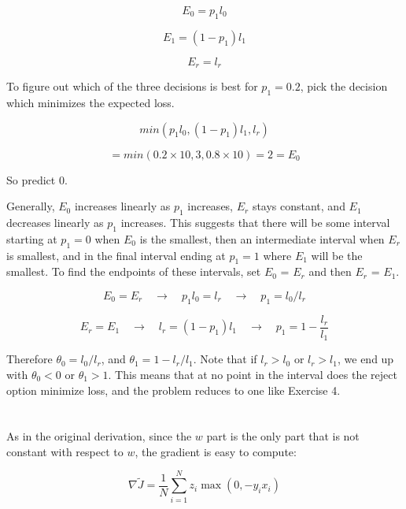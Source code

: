 \documentclass{article}
\begin{document}
\[
E_0 = p_1l_0 
\]

\[
E_1 = (1-p_1)l_1
\]

\[
E_r = l_r
\]

To figure out which of the three decisions is best for $p_1 = 0.2$, pick the
decision which minimizes the expected loss.

\[
min(p_1l_0, (1-p_1)l_1, l_r)
\]

\[
= min(0.2 \times 10, 3, 0.8 \times 10) = 2 = E_0
\]

So predict 0.

\vspace{1em}

Generally, $E_0$ increases linearly as $p_1$ increases, $E_r$ stays constant,
and $E_1$ decreases linearly as $p_1$ increases. This suggests that there will
be some interval starting at $p_1 = 0$ when $E_0$ is the smallest, then an
intermediate interval when $E_r$ is smallest, and in the final interval ending
at $p_1 = 1$ where $E_1$
will be the smallest. To find the endpoints of these intervals, set
$E_0$ = $E_r$ and then $E_r$ = $E_1$.

\[
E_0 = E_r \hspace{1em} \rightarrow \hspace{1em} p_1l_0 = l_r 
\hspace{1em} \rightarrow \hspace{1em} p_1 = l_0/l_r
\]

\[
E_r = E_1 \hspace{1em} \rightarrow \hspace{1em} l_r = (1-p_1)l_1 \hspace{1em}
\rightarrow \hspace{1em} p_1 = 1-\frac{l_r}{l_1}
\]

Therefore $\theta_0 = l_0/l_r$, and $\theta_1 = 1-l_r/l_1$. Note that if
$l_r > l_0$ or $l_r > l_1$, we end up with $\theta_0 < 0$ or $\theta_1 > 1$.
This means that at no point in the interval does the reject option minimize 
loss, and the problem reduces to one like Exercise 4.

\section{}
As in the original derivation, since the $w$ part is the only part that is not
constant with respect to $w$, the gradient is easy to compute:

\[
\nabla \tilde J = \frac{1}{N} \sum^N_{i=1} z_i \max(0, -y_ix_i)
\]

\newpage
\end{document}
